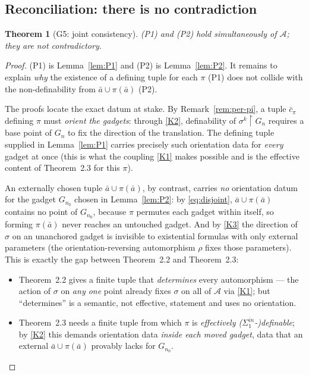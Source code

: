 \documentclass[12pt,fullpage]{article}
\newtheorem{theorem}{Theorem}[section]
\theoremstyle{definition}
\newcommand{\A}{\mathcal{A}}
\begin{document}
\subsection*{Reconciliation: there is no contradiction}

\begin{theorem}[G5: joint consistency]\label{thm:G5}
(P1) and (P2) hold simultaneously of $\A$; they are not contradictory.
\end{theorem}

\begin{proof}
(P1) is Lemma~\ref{lem:P1} and (P2) is Lemma~\ref{lem:P2}.  It remains to
explain \emph{why} the existence of a defining tuple for each $\pi$ (P1) does
not collide with the non-definability from $\bar a\cup\pi(\bar a)$ (P2).

The proofs locate the exact datum at stake.  By Remark~\ref{rem:per-pi}, a
tuple $\bar c_\pi$ defining $\pi$ must \emph{orient the gadgets}: through
\ref{K2}, definability of $\sigma^k\restriction G_n$ requires a base point of
$G_n$ to fix the direction of the translation.  The defining tuple supplied in
Lemma~\ref{lem:P1} carries precisely such orientation data for \emph{every}
gadget at once (this is what the coupling \ref{K1} makes possible and is the
effective content of Theorem~2.3 for this $\pi$).

An externally chosen tuple $\bar a\cup\pi(\bar a)$, by contrast, carries
\emph{no} orientation datum for the gadget $G_{n_0}$ chosen in
Lemma~\ref{lem:P2}: by \eqref{eq:disjoint}, $\bar a\cup\pi(\bar a)$ contains
no point of $G_{n_0}$, because $\pi$ permutes each gadget within itself, so
forming $\pi(\bar a)$ never reaches an untouched gadget.  And by \ref{K3} the
direction of $\sigma$ on an unanchored gadget is invisible to existential
formulas with only external parameters (the orientation-reversing
automorphism $\rho$ fixes those parameters).  This is exactly the gap between
Theorem~2.2 and Theorem~2.3:
\begin{itemize}
\item Theorem~2.2 gives a finite tuple that \emph{determines} every
  automorphism --- the action of $\sigma$ on \emph{any one} point already
  fixes $\sigma$ on all of $\A$ via \ref{K1}; but ``determines'' is a
  semantic, not effective, statement and uses no orientation.
\item Theorem~2.3 needs a finite tuple from which $\pi$ is \emph{effectively
  ($\Sigma^{in}_1$-)definable}; by \ref{K2} this demands orientation data
  \emph{inside each moved gadget}, data that an external
  $\bar a\cup\pi(\bar a)$ provably lacks for $G_{n_0}$.
\end{itemize}


\end{proof}
\end{document}
